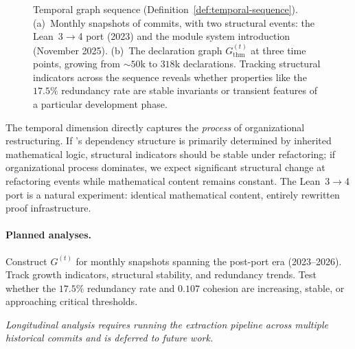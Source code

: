 \begin{figure}[!htb]
\begin{subfigure}[t]{0.58\textwidth}
\label{fig:temporal-graph}
\end{subfigure}
\caption{Temporal graph sequence (Definition~\ref{def:temporal-sequence}). (a)~Monthly snapshots of  commits, with two structural events: the Lean~3$\to$4 port (2023) and the module system introduction (November 2025). (b)~The declaration graph $G_{\mathrm{thm}}^{(t)}$ at three time points, growing from ${\sim}50$k to $318$k declarations. Tracking structural indicators across the sequence reveals whether properties like the $17.5\%$ redundancy rate are stable invariants or transient features of a particular development phase.}
\label{fig:temporal-sequence}
\end{figure}

The temporal dimension directly captures the \emph{process} of organizational restructuring. If 's dependency structure is primarily determined by inherited mathematical logic, structural indicators should be stable under refactoring; if organizational process dominates, we expect significant structural change at refactoring events while mathematical content remains constant. The Lean~3$\to$4 port is a natural experiment: identical mathematical content, entirely rewritten proof infrastructure.

\paragraph{Planned analyses.}
Construct $G^{(t)}$ for monthly snapshots spanning the post-port era (2023--2026). Track growth indicators, structural stability, and redundancy trends. Test whether the $17.5\%$ redundancy rate and $0.107$ cohesion are increasing, stable, or approaching critical thresholds.

\emph{Longitudinal analysis requires running the extraction pipeline across multiple historical commits and is deferred to future work.}
